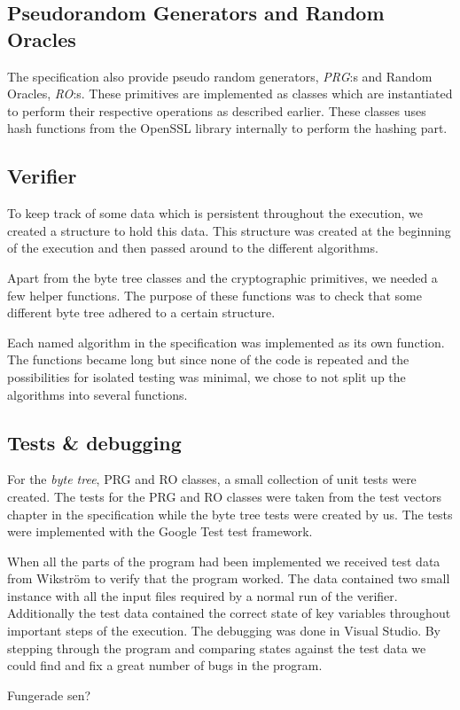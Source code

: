 \subsection{Pseudorandom Generators and Random Oracles}

The specification also provide pseudo random generators, \emph{PRG}:s and Random Oracles, \emph{RO}:s. These primitives are implemented as classes which are instantiated to perform their respective operations as described earlier. These classes uses hash functions from the OpenSSL library internally to perform the hashing part.

\subsection{Verifier}

To keep track of some data which is persistent throughout the execution, we created a structure to hold this data. This structure was created at the beginning of the execution and then passed around to the different algorithms.

Apart from the byte tree classes and the cryptographic primitives, we needed a few helper functions. The purpose of these functions was to check that some different byte tree adhered to a certain structure.

Each named algorithm in the specification was implemented as its own function. The functions became long but since none of the code is repeated and the possibilities for isolated testing was minimal, we chose to not split up the algorithms into several functions.

\subsection{Tests \& debugging}

For the \emph{byte tree}, PRG and RO classes, a small collection of unit tests were created. The tests for the PRG and RO classes were taken from the test vectors chapter in the specification while the byte tree tests were created by us. The tests were implemented with the Google Test test framework.

When all the parts of the program had been implemented we received test data from Wikström to verify that the program worked. The data contained two small instance with all the input files required by a normal run of the verifier. Additionally the test data contained the correct state of key variables throughout important steps of the execution. The debugging was done in Visual Studio. By stepping through the program and comparing states against the test data we could find and fix a great number of bugs in the program.

Fungerade sen?
